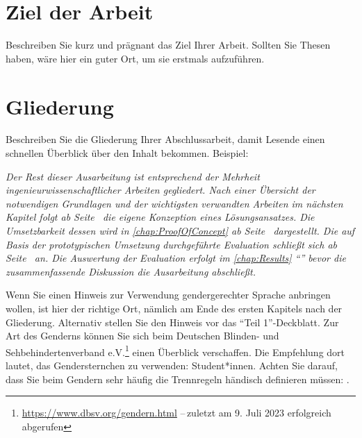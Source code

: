 \section{Ziel der Arbeit}\label{sec:Intro:Goal}
Beschreiben Sie kurz und prägnant das Ziel Ihrer Arbeit. Sollten Sie Thesen haben, wäre hier ein guter Ort, um sie erstmals aufzuführen.


\section{Gliederung}\label{sec:Intro:Structure}
Beschreiben Sie die Gliederung Ihrer Abschlussarbeit, damit Lesende einen schnellen Überblick über den Inhalt bekommen. Beispiel:

\emph{Der Rest dieser Ausarbeitung ist entsprechend der Mehrheit ingenieurwissenschaftlicher Arbeiten gegliedert. Nach einer Übersicht der notwendigen Grundlagen und der wichtigsten verwandten Arbeiten im nächsten Kapitel folgt ab Seite~\pageref{chap:Concept} die eigene Konzeption eines Lösungsansatzes. Die Umsetzbarkeit dessen wird in \autoref{chap:ProofOfConcept} ab Seite~\pageref{chap:ProofOfConcept} dargestellt. Die auf Basis der prototypischen Umsetzung durchgeführte Evaluation schließt sich ab Seite~\pageref{chap:Evaluation} an. Die Auswertung der Evaluation erfolgt im \autoref{chap:Results} \enquote{} bevor die zusammenfassende Diskussion die Ausarbeitung abschließt.}

Wenn Sie einen Hinweis zur Verwendung gendergerechter Sprache anbringen wollen, ist hier der richtige Ort, nämlich am Ende des ersten Kapitels nach der Gliederung. Alternativ stellen Sie den Hinweis vor das \enquote{Teil 1}-Deckblatt. Zur Art des Genderns können Sie sich beim Deutschen Blinden- und Sehbehindertenverband e.V.\footnote{\url{https://www.dbsv.org/gendern.html} --\,zuletzt am 9. Juli 2023 erfolgreich abgerufen} einen Überblick verschaffen. Die Empfehlung dort lautet, das Gendersternchen zu verwenden: Stu\-dent*\-in\-nen. Achten Sie darauf, dass Sie beim Gendern sehr häufig die Trennregeln händisch definieren müssen: .